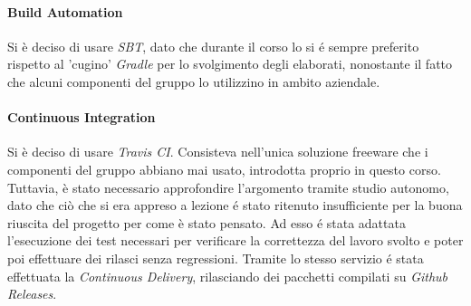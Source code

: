 \documentclass{article}
\begin{document}
    \paragraph{Build Automation}
    Si è deciso di usare \textit{SBT}, dato che durante il corso lo si é sempre preferito rispetto al 'cugino' \textit{Gradle} per lo svolgimento degli elaborati, nonostante il fatto che alcuni componenti del gruppo lo utilizzino in ambito aziendale.

    \paragraph{Continuous Integration}
    Si è deciso di usare \textit{Travis CI}.
    Consisteva nell'unica soluzione freeware che i componenti del gruppo abbiano mai usato, introdotta proprio in questo corso.
    Tuttavia, è stato necessario approfondire l'argomento tramite studio autonomo, dato che ciò che si era appreso a lezione é stato ritenuto insufficiente per la buona riuscita del progetto per come è stato pensato.
    Ad esso é stata adattata l'esecuzione dei test necessari per verificare la correttezza del lavoro svolto e poter poi effettuare dei rilasci senza regressioni.
    Tramite lo stesso servizio é stata effettuata la \textit{Continuous Delivery}, rilasciando dei pacchetti compilati su \textit{Github Releases}.

    \newpage
\end{document}
